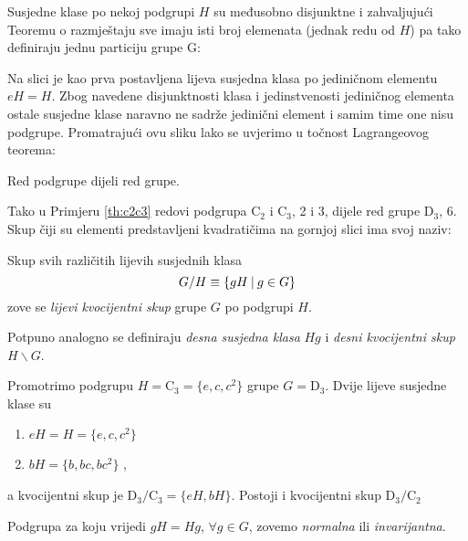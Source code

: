 Susjedne klase po nekoj podgrupi $H$ su međusobno disjunktne i
zahvaljujući Teoremu o razmještaju sve imaju isti broj elemenata (jednak redu od $H$)
pa tako definiraju jednu particiju grupe G:\\[2ex]
\centerline{}

Na slici je kao prva postavljena lijeva susjedna klasa po jediničnom
elementu $eH = H$. Zbog navedene disjunktnosti klasa i jedinstvenosti
jediničnog elementa ostale susjedne klase naravno ne sadrže jedinični element i
samim time one nisu podgrupe. 
Promatrajući ovu sliku lako se uvjerimo u točnost Lagrangeovog
teorema:

\begin{teorem}[Lagrange]
Red podgrupe dijeli red grupe.
\end{teorem}

Tako u Primjeru \ref{th:c2c3} redovi podgrupa C$_2$ i C$_3$, 2 i 3, dijele red
grupe D$_3$, 6. Skup čiji su elementi predstavljeni kvadratičima na gornjoj slici
ima svoj naziv:

\begin{definicija}
Skup svih različitih lijevih susjednih klasa 
\begin{displaymath}
      G/H \equiv \{gH \: | \: g\in G\}
\end{displaymath}
zove se \emph{lijevi kvocijentni skup} grupe $G$ po podgrupi $H$.
\end{definicija}

Potpuno analogno se definiraju \emph{desna susjedna klasa} $Hg$
i \emph{desni kvocijentni skup} $H\backslash G$.

\begin{primjer}[D$_3$]
    Promotrimo podgrupu $H=\mathrm{C}_3=\{e, c, c^2\}$ grupe $G=\mathrm{D}_3$.
Dvije lijeve susjedne klase su
\begin{enumerate}
\item $eH=H=\{e, c, c^2\}$ \; 
\item $bH=\{b, bc, bc^2\}$ \;,
\end{enumerate}
a kvocijentni skup je $\mathrm{D}_3/\mathrm{C}_3=\{eH, bH\}$. Postoji i kvocijentni 
skup $\mathrm{D}_3/\mathrm{C}_2$
\end{primjer}

\begin{definicija}
Podgrupa za koju vrijedi $gH=Hg$, $\forall g\in G$, zovemo
\emph{normalna} ili \emph{invarijantna}.
\label{tm:normalnapodgrupa}
\end{definicija}

